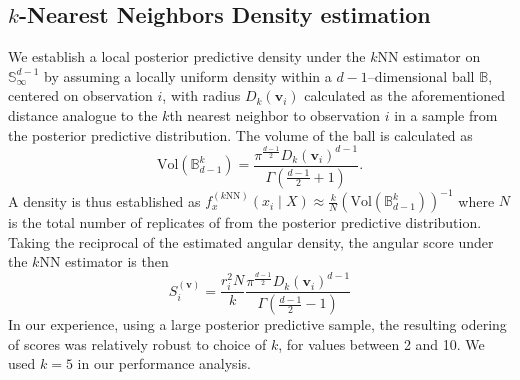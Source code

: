 
\subsection{$k$-Nearest Neighbors Density estimation}
We establish a local posterior predictive density under the $k$NN estimator 
    \citep{mack1979} on $\mathbb{S}_{\infty}^{d-1}$ by assuming a locally 
    uniform density within a $d-1$--dimensional ball $\mathbb{B}$, centered on 
    observation $i$, with radius $D_{k}(\bm{v}_i)$ calculated as the 
    aforementioned distance analogue 
    to the $k$th nearest neighbor to observation $i$ in a sample from the 
    posterior predictive distribution. The volume of the ball is calculated as
    \begin{equation}
        \label{eq:vol_sphere}
        \text{Vol}(\mathbb{B}_{d-1}^k) =
        \frac{\pi^{\frac{d-1}{2}}D_{k}(\bm{v}_i)^{d-1}}{
            \Gamma\left(\frac{d-1}{2} + 1\right)}.
    \end{equation}
    A density is thus established as 
    $f_{x}^{(k\text{NN})}(x_i\mid X) \approx 
        \frac{k}{N}\left(\text{Vol}(\mathbb{B}_{d-1}^k)\right)^{-1}$
    where $N$ is the total number of replicates of from the posterior predictive
    distribution.  Taking the reciprocal of the estimated angular density, 
    the angular score under the $k$NN estimator is then
    \begin{equation}
        \label{eq:ad_knn_h}
        S_i^{(\bm{v})} = \frac{r_i^{2}N}{k}
            \frac{\pi^{\frac{d-1}{2}}D_{k}(\bm{v}_i)^{d-1}}{
            \Gamma\left(\frac{d-1}{2} - 1\right)}
    \end{equation}
    In our experience, using a large posterior predictive sample, 
    the resulting odering of scores was relatively robust to choice of $k$, for
    values between 2 and 10.  We used $k = 5$ in our performance analysis.

